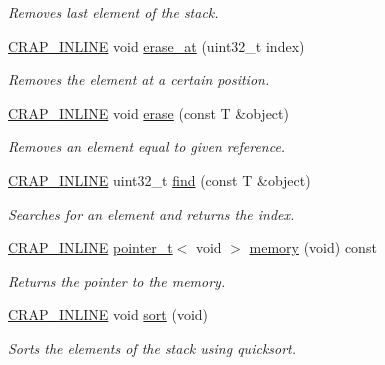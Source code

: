 \begin{DoxyCompactItemize}
\begin{DoxyCompactList}\small\item\em Removes last element of the stack. \end{DoxyCompactList}\item 
\hyperlink{config__x86_8h_a5a40526b8d842e7ff731509998bb0f1c}{C\+R\+A\+P\+\_\+\+I\+N\+L\+I\+N\+E} void \hyperlink{classcrap_1_1stack_ab7388d3934a8743deb757d6940f2ab5e}{erase\+\_\+at} (uint32\+\_\+t index)
\begin{DoxyCompactList}\small\item\em Removes the element at a certain position. \end{DoxyCompactList}\item 
\hyperlink{config__x86_8h_a5a40526b8d842e7ff731509998bb0f1c}{C\+R\+A\+P\+\_\+\+I\+N\+L\+I\+N\+E} void \hyperlink{classcrap_1_1stack_ad5fd9e4983eeec2ef8b195e572adc449}{erase} (const T \&object)
\begin{DoxyCompactList}\small\item\em Removes an element equal to given reference. \end{DoxyCompactList}\item 
\hyperlink{config__x86_8h_a5a40526b8d842e7ff731509998bb0f1c}{C\+R\+A\+P\+\_\+\+I\+N\+L\+I\+N\+E} uint32\+\_\+t \hyperlink{classcrap_1_1stack_ad2ae8ccc70e59dc037a3a10575ad2618}{find} (const T \&object)
\begin{DoxyCompactList}\small\item\em Searches for an element and returns the index. \end{DoxyCompactList}\item 
\hyperlink{config__x86_8h_a5a40526b8d842e7ff731509998bb0f1c}{C\+R\+A\+P\+\_\+\+I\+N\+L\+I\+N\+E} \hyperlink{structcrap_1_1pointer__t}{pointer\+\_\+t}$<$ void $>$ \hyperlink{classcrap_1_1stack_aa2c7c543590722855e78060cafdcd545}{memory} (void) const 
\begin{DoxyCompactList}\small\item\em Returns the pointer to the memory. \end{DoxyCompactList}\item 
\hyperlink{config__x86_8h_a5a40526b8d842e7ff731509998bb0f1c}{C\+R\+A\+P\+\_\+\+I\+N\+L\+I\+N\+E} void \hyperlink{classcrap_1_1stack_ac1b3e2b0d9261871c07ca916efa38644}{sort} (void)
\begin{DoxyCompactList}\small\item\em Sorts the elements of the stack using quicksort. \end{DoxyCompactList}\end{DoxyCompactItemize}
